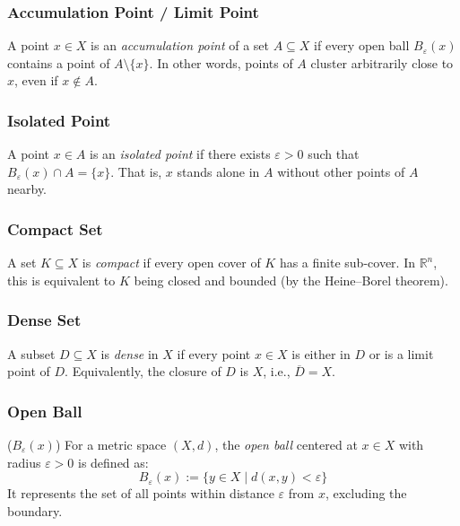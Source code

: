 	 \subsubsection{Accumulation Point / Limit Point}
		 A point \( x \in X \) is an \emph{accumulation point} of a set \( A \subseteq X \)
		  if every open ball \( B_\varepsilon(x) \) contains a point of \( A \setminus \{x\} \). 
	      In other words, points of \( A \) cluster arbitrarily close to 
		  \( x \), even if \( x \notin A \).

	 \subsubsection{Isolated Point} 
	      A point \( x \in A \) is an \emph{isolated point} if there exists \( \varepsilon > 0 \)
		   such that \( B_\varepsilon(x) \cap A = \{x\} \). 
	      That is, \( x \) stands alone in \( A \) without other points of \( A \) nearby.

	 \subsubsection{Compact Set} 
	      A set \( K \subseteq X \) is \emph{compact} if every open cover of \( K \) has a finite sub-cover. 
	      In \(\mathbb{R}^n\), this is equivalent to \( K \) being closed and bounded (by the Heine–Borel theorem).

	 \subsubsection{Dense Set} 
	      A subset \( D \subseteq X \) is \emph{dense} in \( X \) if every point 
		  \( x \in X \) is either in \( D \) or is a limit point of \( D \). 
	      Equivalently, the closure of \( D \) is \( X \), i.e., \( \overline{D} = X \).

	 \subsubsection{Open Ball} (\( B_\varepsilon(x) \)) 
	      For a metric space \( (X, d) \), the \emph{open ball} centered at 
		  \( x \in X \) with radius \( \varepsilon > 0 \) is defined as: 
	      \[
		      B_\varepsilon(x) := \{ y \in X \mid d(x, y) < \varepsilon \}
	      \]
	      It represents the set of all points within distance \( \varepsilon \) from \( x \), excluding the boundary.

\newpage
